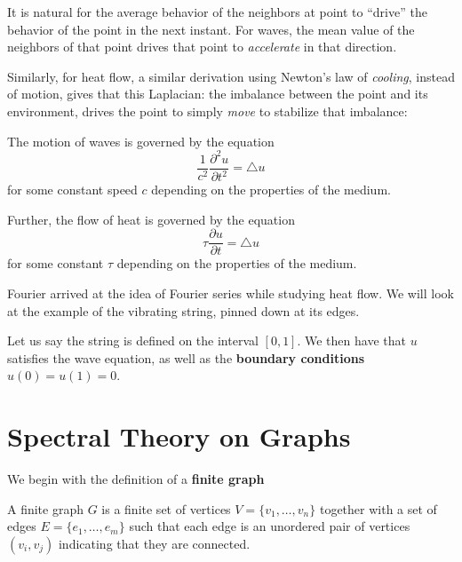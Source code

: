 	It is natural for the average behavior of the neighbors at point to ``drive'' the behavior of the point in the next instant. For waves, the mean value of the neighbors of that point drives that point to \emph{accelerate} in that direction. 
	
	Similarly, for heat flow, a similar derivation using Newton's law of \emph{cooling}, instead of motion, gives that this Laplacian: the imbalance between the point and its environment, drives the point to simply \emph{move} to stabilize that imbalance:
	\begin{concept}
		The motion of waves is governed by the equation
		\begin{equation*}
			\frac{1}{c^2} \frac{\partial^2 u}{\partial t^2} = \triangle u
		\end{equation*}
		for some constant speed $c$ depending on the properties of the medium.
		
		Further, the flow of heat is governed by the equation
		\begin{equation*}
			\tau \frac{\partial u}{\partial t} = \triangle u
		\end{equation*}
		for some constant $\tau$ depending on the properties of the medium. 
	\end{concept}
	
	Fourier arrived at the idea of Fourier series while studying heat flow. We will look at the example of the vibrating string, pinned down at its edges. 
	
	Let us say the string is defined on the interval $[0,1]$. We then have that $u$ satisfies the wave equation, as well as the \textbf{boundary conditions} $u(0)= u(1)= 0$.


\section{Spectral Theory on Graphs} %
\label{sec:spectral_theory_on_graphs}

	We begin with the definition of a \textbf{finite graph}
	\begin{defn}
		A finite graph $G$ is a finite set of vertices $V = \{v_1, \dots, v_n\}$ together with a set of edges $E = \{e_1, \dots, e_m\}$ such that each edge is an unordered pair of vertices $(v_i, v_j)$ indicating that they are connected.
	\end{defn}
	

